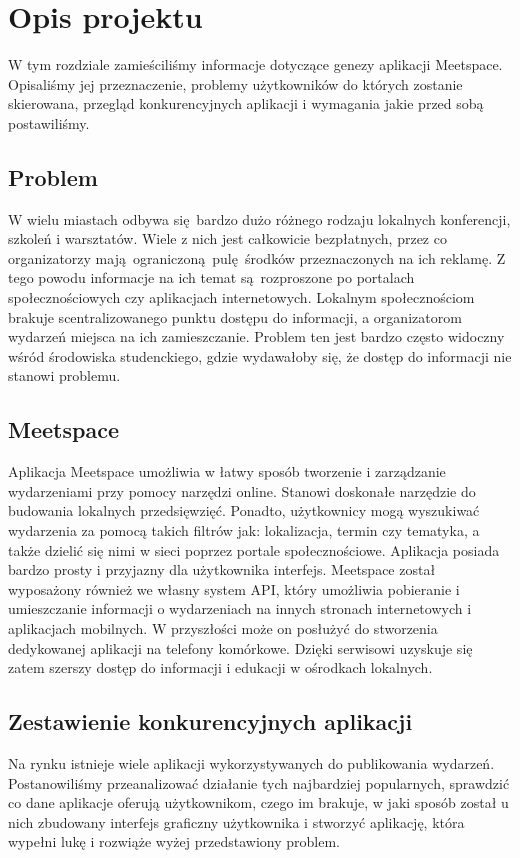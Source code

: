 \section{Opis projektu}
W tym rozdziale zamieściliśmy informacje dotyczące genezy aplikacji Meetspace. Opisaliśmy jej przeznaczenie, problemy użytkowników do których zostanie skierowana, przegląd konkurencyjnych aplikacji i wymagania jakie przed sobą postawiliśmy.
\subsection{Problem}
W wielu miastach odbywa się bardzo dużo różnego rodzaju lokalnych konferencji, szkoleń i warsztatów. Wiele z nich jest całkowicie bezpłatnych, przez co organizatorzy mają ograniczoną pulę środków przeznaczonych na ich reklamę. Z tego powodu informacje na ich temat są rozproszone po portalach społecznościowych czy aplikacjach internetowych. Lokalnym społecznościom brakuje scentralizowanego punktu dostępu do informacji, a organizatorom wydarzeń miejsca na ich zamieszczanie. Problem ten jest bardzo często widoczny wśród środowiska studenckiego, gdzie wydawałoby się, że dostęp do informacji nie stanowi problemu.  
\subsection{Meetspace}
Aplikacja Meetspace umożliwia w łatwy sposób tworzenie i zarządzanie wydarzeniami przy pomocy narzędzi online. Stanowi doskonałe narzędzie do budowania lokalnych przedsięwzięć. Ponadto, użytkownicy mogą wyszukiwać wydarzenia za pomocą takich filtrów jak: lokalizacja, termin czy tematyka, a także dzielić się nimi w sieci poprzez portale społecznościowe. Aplikacja posiada bardzo prosty i przyjazny dla użytkownika interfejs. Meetspace został wyposażony również we własny system API, który umożliwia pobieranie i umieszczanie informacji o wydarzeniach na innych stronach internetowych i aplikacjach mobilnych. W przyszłości może on posłużyć do stworzenia dedykowanej aplikacji na telefony komórkowe. Dzięki serwisowi uzyskuje się zatem szerszy dostęp do informacji i edukacji w ośrodkach lokalnych.
\subsection{Zestawienie konkurencyjnych aplikacji}
Na rynku istnieje wiele aplikacji wykorzystywanych do publikowania wydarzeń. Postanowiliśmy przeanalizować działanie tych najbardziej popularnych, sprawdzić co dane aplikacje oferują użytkownikom, czego im brakuje, w jaki sposób został u nich zbudowany interfejs graficzny użytkownika i stworzyć aplikację, która wypełni lukę i rozwiąże wyżej przedstawiony problem.


